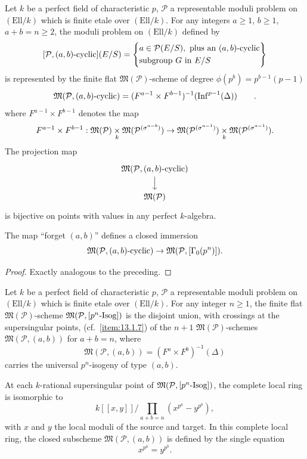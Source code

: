 \begin{kprop}\label{prop:13.4.5}
Let $k$ be a perfect field of characteristic $p$, $\mathcal{P}$ a representable moduli problem on $(\mathrm{Ell}/k)$ which is finite etale over $(\mathrm{Ell}/k)$. For any integers $a \ge 1$, $b \ge 1$, $a + b = n \ge 2$, the moduli problem on $(\mathrm{Ell}/k)$ defined by
\[
[\mathcal{P}, (a,b)\text{-\rm cyclic}](E/S) = \left\{ \begin{aligned} &a \in \mathcal{P}(E/S), \text{ plus an } (a,b)\text{-cyclic} \\ &\text{subgroup } G \text{ in } E/S \end{aligned} \right\}
\]
is represented by the finite flat $\mathfrak{M}(\mathcal{P})$-scheme of degree $\phi(p^b) = p^{b-1}(p-1)$
\[
\mathfrak{M}(\mathcal{P}, (a,b)\text{-\rm cyclic}) = (F^{a-1} \times F^{b-1})^{-1}(\mathrm{Inf}^{p-1}(\Delta)) \qquad .
\]
where $F^{a-1} \times F^{b-1}$ denotes the map
\[
F^{a-1} \times F^{b-1} : \mathfrak{M}(\mathcal{P}) \underset{k}{\times} \mathfrak{M}(\mathcal{P}^{(\sigma^{a-b})}) \to \mathfrak{M}(\mathcal{P}^{(\sigma^{a-1})}) \underset{k}{\times} \mathfrak{M}(\mathcal{P}^{(\sigma^{a-1})}) .
\]
The projection map
\[
\begin{tikzcd}[row sep=1.6em]
\mathfrak{M}(\mathcal{P}, (a,b)\text{-\rm cyclic}) \arrow[d] \\
\mathfrak{M}(\mathcal{P})
\end{tikzcd}
\]
is bijective on points with values in any perfect $k$-algebra.

The map ``forget $(a,b)$'' defines a closed immersion
\[
\mathfrak{M}(\mathcal{P}, (a,b)\text{-\rm cyclic}) \to \mathfrak{M}(\mathcal{P}, [\Gamma_0(p^n)]) .
\]
\end{kprop}

\begin{proof}
Exactly analogous to the preceding.
\end{proof}

\begin{kthm}\label{thm:13.4.6}
Let $k$ be a perfect field of characteristic $p$, $\mathcal{P}$ a representable moduli problem on $(\mathrm{Ell}/k)$ which is finite etale over $(\mathrm{Ell}/k)$. For any integer $n \ge 1$, the finite flat $\mathfrak{M}(\mathcal{P})$-scheme $\mathfrak{M}(\mathcal{P}, [p^n\text{-\rm Isog}])$ is the disjoint union, with crossings at the supersingular points, (cf.~\ref{item:13.1.7}) of the $n+1$ $\mathfrak{M}(\mathcal{P})$-schemes $\mathfrak{M}(\mathcal{P}, (a,b))$ for $a+b = n$, where
\[
\mathfrak{M}(\mathcal{P}, (a,b)) = (F^a \times F^b)^{-1}(\Delta)
\]
carries the universal $p^n$-isogeny of type $(a,b)$.

At each $k$-rational supersingular point of $\mathfrak{M}(\mathcal{P}, [p^n\text{-\rm Isog}])$, the complete local ring is isomorphic to
\[
k[[x, y]] \Big/ \prod_{a+b=n} (x^{p^a} - y^{p^b}) ,
\]
with $x$ and $y$ the local moduli of the source and target. In this complete local ring, the closed subscheme $\mathfrak{M}(\mathcal{P}, (a,b))$ is defined by the single equation
\[
x^{p^a} = y^{p^b} .
\]
\end{kthm}

